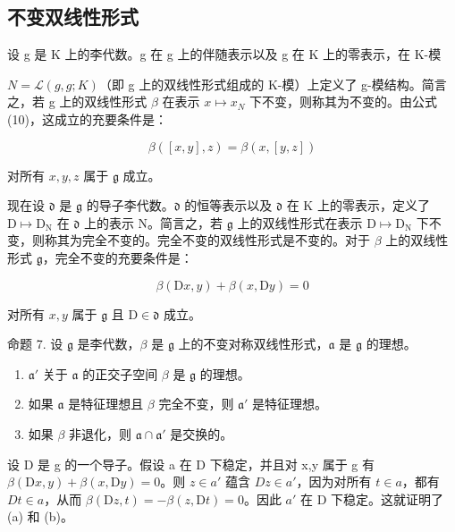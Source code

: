 \subsection{不变双线性形式}

设 g 是 K 上的李代数。g 在 g 上的伴随表示以及 g 在 K 上的零表示，在 K-模

\(N = \mathcal{L}(g, g; K)\)（即 g 上的双线性形式组成的 K-模）上定义了 g-模结构。简言之，若 g 上的双线性形式 \(\beta\) 在表示 \(x \mapsto x_{N}\) 下不变，则称其为不变的。由公式 (10)，这成立的充要条件是：

\[
\beta ([ x, y ], z) = \beta (x, [ y, z ])\tag{13}
\]

对所有 \(x, y, z\) 属于 \(\mathfrak{g}\) 成立。

现在设 \(\mathfrak{d}\) 是 \(\mathfrak{g}\) 的导子李代数。\(\mathfrak{d}\) 的恒等表示以及 \(\mathfrak{d}\) 在 \(\mathrm{K}\) 上的零表示，定义了 \(\mathrm{D} \mapsto \mathrm{D}_{\mathrm{N}}\) 在 \(\mathfrak{d}\) 上的表示 \(\mathrm{N}\)。简言之，若 \(\mathfrak{g}\) 上的双线性形式在表示 \(\mathrm{D} \mapsto \mathrm{D}_{\mathrm{N}}\) 下不变，则称其为完全不变的。完全不变的双线性形式是不变的。对于 \(\beta\) 上的双线性形式 \(\mathfrak{g}\)，完全不变的充要条件是：

\[
\beta (\mathrm{D} x, y) + \beta (x, \mathrm{D} y) = 0\tag{14}
\]

对所有 \(x, y\) 属于 \(\mathfrak{g}\) 且 \(\mathrm{D} \in \mathfrak{d}\) 成立。

命题 7. 设 \(\mathfrak{g}\) 是李代数，\(\beta\) 是 \(\mathfrak{g}\) 上的不变对称双线性形式，\(\mathfrak{a}\) 是 \(\mathfrak{g}\) 的理想。

\begin{enumerate}
\def\labelenumi{(\alph{enumi})}
\item
  \(\mathfrak{a}'\) 关于 \(\mathfrak{a}\) 的正交子空间 \(\beta\) 是 \(\mathfrak{g}\) 的理想。
\item
  如果 \(\mathfrak{a}\) 是特征理想且 \(\beta\) 完全不变，则 \(\mathfrak{a}'\) 是特征理想。
\item
  如果 \(\beta\) 非退化，则 \(\mathfrak{a} \cap \mathfrak{a}'\) 是交换的。
\end{enumerate}

设 D 是 g 的一个导子。假设 a 在 D 下稳定，并且对 x,y 属于 g 有 \(\beta(\mathrm{D}x,y)+\beta(x,\mathrm{D}y)=0\)。则 \(z\in a'\) 蕴含 \(Dz\in a'\)，因为对所有 \(t\in a\)，都有 \(Dt\in a\)，从而 \(\beta(\mathrm{D}z,t)=-\beta(z,\mathrm{D}t)=0\)。因此 \(a'\) 在 D 下稳定。这就证明了 (a) 和 (b)。

